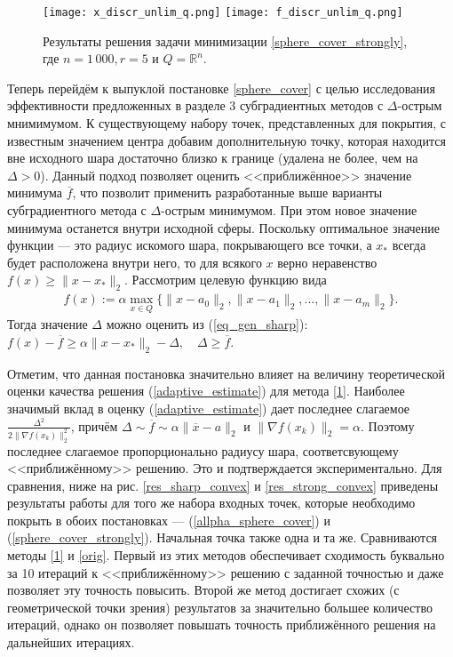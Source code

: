     \begin{figure}[h]
        \texttt{[image: x\_discr\_unlim\_q.png]}
        \endminipage\hfill
        \texttt{[image: f\_discr\_unlim\_q.png]}
        \endminipage\hfill
        \caption{ Результаты решения задачи минимизации \ref{sphere_cover_strongly}, где  $n= 1\,000, r = 5$ и  $Q = \mathbb{R}^n$.}
        \label{res_ex_strong_unlim}
    \end{figure}

    Теперь перейдём к выпуклой постановке \eqref{sphere_cover} с целью исследования эффективности предложенных в разделе 3 субградиентных методов с $\Delta$-острым мнимимумом. К существующему набору точек, представленных для покрытия, с известным значением центра добавим дополнительную точку, которая находится вне исходного шара достаточно близко к границе (удалена не более, чем на $\Delta > 0$). Данный подход позволяет оценить <<приближённое>> значение минимума $\overline{f}$, что позволит применить разработанные выше варианты субградиентного метода с $\Delta$-острым минимумом. При этом новое значение минимума останется внутри исходной сферы. Поскольку оптимальное значение функции --- это радиус искомого шара, покрывающего все точки, а $x_*$ всегда будет расположена внутри него, то для всякого $x$ верно неравенство $ f(x) \geq \| x - x_*\|_2$. Рассмотрим целевую функцию вида
    \begin{gather}\label{allpha_sphere_cover}
        f(x) := \alpha \max_{x\in Q}\{\|x - a_0\|_2, \|x - a_1\|_2, ..., \|x - a_m\|_2\}.
    \end{gather}
    Тогда значение $\Delta$ можно оценить  из (\ref{eq_gen_sharp}): 
        $f(x) - \overline{f} \geq \alpha\|x- x_*\|_2 - \Delta, \quad \Delta \geq \overline{f}$.

    Отметим, что данная постановка значительно влияет на величину теоретической оценки качества решения (\ref{adaptive_estimate}) для метода \eqref{1}.
    Наиболее значимый вклад в оценку (\ref{adaptive_estimate}) дает последнее слагаемое $\frac{\Delta^2}{2\|\nabla f(x_k)\|^2_2}$, причём 
    $     \Delta \sim \overline{f} \sim \alpha \|\overline{x}-a\|_2 $ и 
    $     \|\nabla f(x_k)\|_2 = \alpha $. Поэтому последнее слагаемое пропорционально радиусу шара, соответсвующему <<приближённому>> решению. Это и подтверждается экспериментально. Для сравнения, ниже на рис. \ref{res_sharp_convex} и \ref{res_strong_convex} приведены результаты работы для того же набора входных точек, которые необходимо покрыть в обоих постановках --- (\ref{allpha_sphere_cover}) и (\ref{sphere_cover_strongly}). Начальная точка также одна и та же. Сравниваются методы \eqref{1} и \eqref{orig}. Первый из этих методов обеспечивает сходимость буквально за 10 итераций к <<приближённому>> решению с заданной точностью и даже позволяет эту точность повысить. Второй же метод достигает схожих (с геометрической точки зрения) результатов за значительно большее количество итераций, однако он позволяет повышать точность приближённого решения на дальнейших итерациях.

